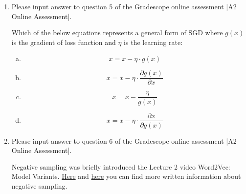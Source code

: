 \begin{enumerate}[1.]
$\hat{y}$ is the predicted output

$y$ is the actual output

|num_tokens|: Number of unique words in the dataset

|embed_size|: size of the word vector(word2vec size)

\begin{enumerate}[(a)]
\item |num_tokens| $\times$ 1
\item |embed_size| $\times$ 1
\item |embed_size| $\times$ |num_tokens|
\end{enumerate}

\item {}
Please input answer to question 5 of the Gradescope online assessment |A2 Online Assessment|.

Which of the below equations represents a general form of SGD where $g(x)$ is the gradient of loss function and $\eta$ is the learning rate:

\begin{enumerate}[(a)]
\item \begin{equation*}x = {x - \eta \cdot g(x)}\end{equation*}
\item \begin{equation*}x = {x - \eta \cdot \frac{\partial g(x)}{\partial x}}\end{equation*}
\item \begin{equation*}x = {x - \frac{\eta}{g(x)}}\end{equation*}
\item \begin{equation*}x = {x - \eta \cdot {\frac{\partial x}{\partial g(x)}}}\end{equation*}
\end{enumerate}

\item {}
Please input answer to question 6 of the Gradescope online assessment |A2 Online Assessment|.

Negative sampling was briefly introduced the Lecture 2 video Word2Vec: Model Variants. \href{https://stackoverflow.com/questions/27860652/word2vec-negative-sampling-in-layman-term#answer-27864657}{Here} and \href{https://www.quora.com/What-is-negative-sampling}{here} you can find more written information about negative sampling. 


\end{enumerate}
